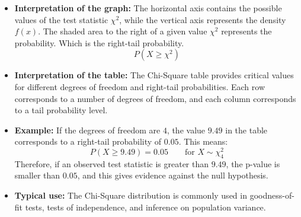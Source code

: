 \begin{itemize}
    \item \textbf{Interpretation of the graph:} The horizontal axis contains the possible values of the test statistic \(\chi^2\), while the vertical axis represents the density \(f(x)\). The shaded area to the right of a given value \(\chi^2\) represents the probability.   Which is the right-tail probability.
    \[
    P(X \geq \chi^2)
    \]
  
\vs
    \item \textbf{Interpretation of the table:} The Chi-Square table provides critical values for different degrees of freedom and right-tail probabilities. Each row corresponds to a number of degrees of freedom, and each column corresponds to a tail probability level.

    \vs
    \item \textbf{Example:} If the degrees of freedom are \(4\), the value \(9.49\) in the table corresponds to a right-tail probability of \(0.05\). This means:
    \[
    P(X \geq 9.49)=0.05 \qquad \text{for } X \sim \chi^2_4
    \]
    Therefore, if an observed test statistic is greater than \(9.49\), the p-value is smaller than \(0.05\), and this gives evidence against the null hypothesis.

    \vs

    \item \textbf{Typical use:} The Chi-Square distribution is commonly used in goodness-of-fit tests, tests of independence, and inference on population variance.
\end{itemize}

